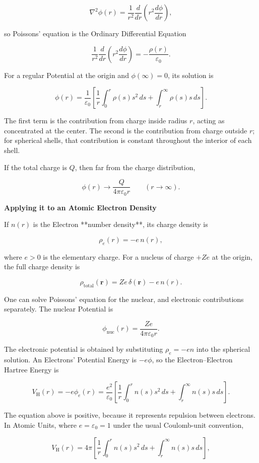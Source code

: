 \documentclass[a4paper, 10pt, onepage]{elegantbook}
\begin{document}
\[
\nabla^2\phi(r)
=
\frac{1}{r^2}\frac{d}{dr}
\left(r^2\frac{d\phi}{dr}\right),
\]

so Poissons' equation is the Ordinary Differential Equation

\[
\frac{1}{r^2}\frac{d}{dr}
\left(r^2\frac{d\phi}{dr}\right)
=
-\frac{\rho(r)}{\varepsilon_0}.
\]

For a regular Potential at the origin and \(\phi(\infty)=0\), its solution is

\[
\phi(r)
=
\frac{1}{\varepsilon_0}
\left[
\frac{1}{r}\int_0^r \rho(s)s^2\,ds
+
\int_r^\infty \rho(s)s\,ds
\right].
\]

The first term is the contribution from charge inside radius \(r\), acting as concentrated at the center. The second is the contribution from charge outside \(r\); for spherical shells, that contribution is constant throughout the interior of each shell.

If the total charge is \(Q\), then far from the charge distribution,

\[
\phi(r)\longrightarrow \frac{Q}{4\pi\varepsilon_0 r}
\qquad (r\to\infty).
\]

\textbf{Applying it to an Atomic Electron Density}

If \(n(r)\) is the Electron **number density**, its charge density is

\[
\rho_e(r)=-e\,n(r),
\]

where \(e>0\) is the elementary charge. For a nucleus of charge \(+Ze\) at the origin, the full charge density is

\[
\rho_{\mathrm{total}}(\mathbf r)
=
Ze\,\delta(\mathbf r)-e\,n(r).
\]

One can solve Poissons' equation for the nuclear, and electronic contributions separately. The nuclear Potential is

\[
\phi_{\mathrm{nuc}}(r)
=
\frac{Ze}{4\pi\varepsilon_0 r}.
\]

The electronic potential is obtained by substituting \(\rho_e=-en\) into the spherical solution. An Electrons' Potential Energy is \(-e\phi\), so the Electron–Electron Hartree Energy is

\[
V_{\mathrm H}(r)
=
-e\phi_e(r)
=
\frac{e^2}{\varepsilon_0}
\left[
\frac{1}{r}\int_0^r n(s)s^2\,ds
+
\int_r^\infty n(s)s\,ds
\right].
\]

The equation above is positive, because it represents repulsion between electrons. In Atomic Units, where \(e=\varepsilon_0=1\) under the usual Coulomb-unit convention,

\[
V_{\mathrm H}(r)
=
4\pi
\left[
\frac{1}{r}\int_0^r n(s)s^2\,ds
+
\int_r^\infty n(s)s\,ds
\right],
\]
\end{document}
